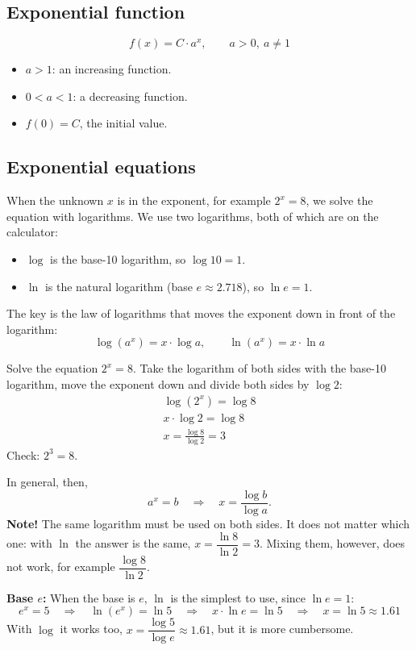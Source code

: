 \subsection{Exponential function}
\label{c8:sec:exponential}
\[
  f(x) = C \cdot a^x, \qquad a > 0,\ a \neq 1
\]
\begin{itemize}
  \item $a > 1$: an increasing function.
  \item $0 < a < 1$: a decreasing function.
  \item $f(0) = C$, the initial value.
\end{itemize}

\subsection{Exponential equations}
\label{c8:sec:expekvationer}
When the unknown $x$ is in the exponent, for example $2^x = 8$, we solve the equation with
logarithms. We use two logarithms, both of which are on the calculator:
\begin{itemize}
  \item $\log$ is the base-10 logarithm, so $\log 10 = 1$.
  \item $\ln$ is the natural logarithm (base $e \approx 2.718$), so $\ln e = 1$.
\end{itemize}
The key is the law of logarithms that moves the exponent down in front of the logarithm:
\[
  \log(a^x) = x \cdot \log a, \qquad \ln(a^x) = x \cdot \ln a
\]

\begin{exempel}
Solve the equation $2^x = 8$. Take the logarithm of both sides with the base-10 logarithm, move the
exponent down and divide both sides by $\log 2$:
\begin{gather*}
  \log(2^x) = \log 8 \\
  x \cdot \log 2 = \log 8 \\
  x = \frac{\log 8}{\log 2} = 3
\end{gather*}
Check: $2^3 = 8$.
\end{exempel}

In general, then,
\[
  a^x = b \quad \Rightarrow \quad x = \frac{\log b}{\log a}.
\]
\textbf{Note!} The same logarithm must be used on both sides. It does not matter which one: with
$\ln$ the answer is the same, $x = \dfrac{\ln 8}{\ln 2} = 3$. Mixing them, however, does not work,
for example $\dfrac{\log 8}{\ln 2}$.

\textbf{Base $e$:} When the base is $e$, $\ln$ is the simplest to use, since $\ln e = 1$:
\[
  e^x = 5 \quad \Rightarrow \quad \ln(e^x) = \ln 5 \quad \Rightarrow \quad x \cdot \ln e = \ln 5
  \quad \Rightarrow \quad x = \ln 5 \approx 1.61
\]
With $\log$ it works too, $x = \dfrac{\log 5}{\log e} \approx 1.61$, but it is more cumbersome.

